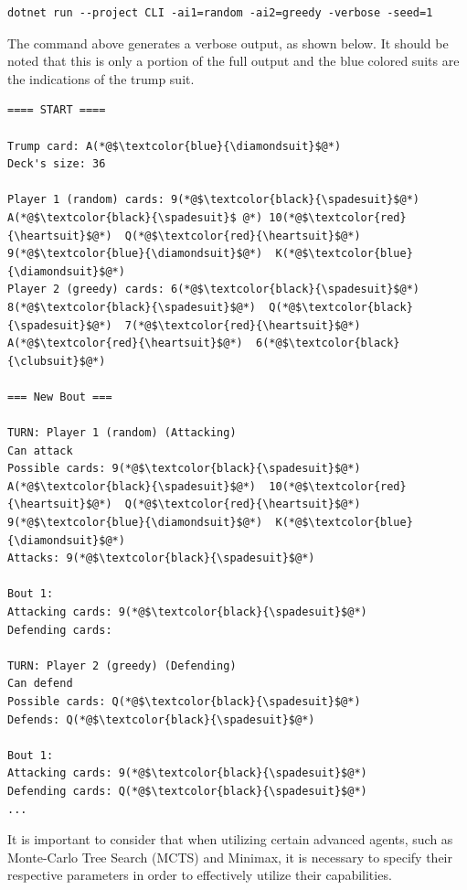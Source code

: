 \begin{lstlisting}[frame=single]
dotnet run --project CLI -ai1=random -ai2=greedy -verbose -seed=1
\end{lstlisting}

The command above generates a verbose output, as shown below. It should be noted that this is only a portion of the full output and the blue colored suits are the indications of the trump suit.

\begin{lstlisting}[frame=single]
==== START ====

Trump card: A(*@$\textcolor{blue}{\diamondsuit}$@*)
Deck's size: 36

Player 1 (random) cards: 9(*@$\textcolor{black}{\spadesuit}$@*)  A(*@$\textcolor{black}{\spadesuit}$ @*) 10(*@$\textcolor{red}{\heartsuit}$@*)  Q(*@$\textcolor{red}{\heartsuit}$@*)  9(*@$\textcolor{blue}{\diamondsuit}$@*)  K(*@$\textcolor{blue}{\diamondsuit}$@*)
Player 2 (greedy) cards: 6(*@$\textcolor{black}{\spadesuit}$@*)  8(*@$\textcolor{black}{\spadesuit}$@*)  Q(*@$\textcolor{black}{\spadesuit}$@*)  7(*@$\textcolor{red}{\heartsuit}$@*)  A(*@$\textcolor{red}{\heartsuit}$@*)  6(*@$\textcolor{black}{\clubsuit}$@*)

=== New Bout ===

TURN: Player 1 (random) (Attacking)
Can attack
Possible cards: 9(*@$\textcolor{black}{\spadesuit}$@*)  A(*@$\textcolor{black}{\spadesuit}$@*)  10(*@$\textcolor{red}{\heartsuit}$@*)  Q(*@$\textcolor{red}{\heartsuit}$@*)  9(*@$\textcolor{blue}{\diamondsuit}$@*)  K(*@$\textcolor{blue}{\diamondsuit}$@*)
Attacks: 9(*@$\textcolor{black}{\spadesuit}$@*)

Bout 1:
Attacking cards: 9(*@$\textcolor{black}{\spadesuit}$@*)
Defending cards:

TURN: Player 2 (greedy) (Defending)
Can defend
Possible cards: Q(*@$\textcolor{black}{\spadesuit}$@*)
Defends: Q(*@$\textcolor{black}{\spadesuit}$@*)

Bout 1:
Attacking cards: 9(*@$\textcolor{black}{\spadesuit}$@*)
Defending cards: Q(*@$\textcolor{black}{\spadesuit}$@*)
...
\end{lstlisting}

It is important to consider that when utilizing certain advanced agents, such as Monte-Carlo Tree Search (MCTS) and Minimax, it is necessary to specify their respective parameters in order to effectively utilize their capabilities. 

